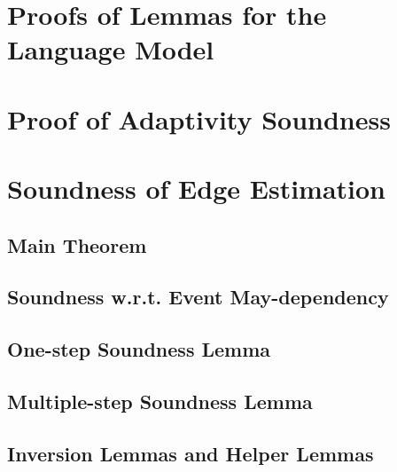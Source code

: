 \section{Proofs of Lemmas for the Language Model}
\label{apdx:lemma_sec123}

\clearpage

\section{Proof of Adaptivity Soundness}
\label{apdx:adapt_soundness}

\clearpage

\section{Soundness of Edge Estimation}
\label{apdx:flowsto_soundness}

\subsection{Main Theorem}

\clearpage

\subsection{Soundness w.r.t. Event May-dependency}
\label{apdx:flowsto_event_soundness}

\clearpage

\subsection{One-step Soundness Lemma}

\clearpage

\subsection{Multiple-step Soundness Lemma}

\clearpage

\subsection{Inversion Lemmas and Helper Lemmas}

\clearpage

